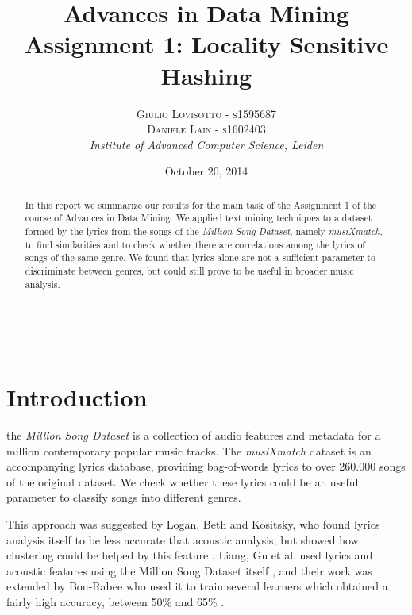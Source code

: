 \documentclass[a4paper, 11pt]{article} %
\title{\textbf{Advances in Data Mining}\\ %
Assignment 1: Locality Sensitive Hashing} %
\author{\textsc{Giulio Lovisotto - s1595687 \\ Daniele Lain - s1602403} %
\\{\textit{Institute of Advanced Computer Science, Leiden}}} %
\date{October 20, 2014} %
\makeatletter
\renewcommand{\maketitle}{ %
\begin{flushright} %
{\LARGE\@title} %

\vspace{50pt} %

{\large\@author} %
\\\@date %

\vspace{40pt} %
\end{flushright}
}
\makeatother
\begin{document}
\maketitle %



\begin{abstract}
In this report we summarize our results for the main task of the  Assignment 1 of the course of Advances in Data Mining.
We applied text mining techniques to a dataset formed by the lyrics from the songs of the \textit{Million Song Dataset}, namely \textit{musiXmatch}, to find similarities and to check whether there are correlations among the lyrics of songs of the same genre. We found that lyrics alone are not a sufficient parameter to discriminate between genres, but could still prove to be useful in broader music analysis.
\end{abstract}

\vspace{20pt} %


\section{Introduction}


the \textit{Million Song Dataset} \cite{MSDS} is a collection of audio features and metadata for a million contemporary popular music tracks. The \textit{musiXmatch} \cite{MXM} dataset is an accompanying lyrics database, providing bag-of-words lyrics to over 260.000 songs of the original dataset.
We check whether these lyrics could be an useful parameter to classify songs into different genres.

 This approach was suggested by Logan, Beth and Kositsky, who found lyrics analysis itself to be less accurate that acoustic analysis, but showed how clustering could be helped by this feature \cite{logan2004semantic}. Liang, Gu et al. used lyrics and acoustic features using the Million Song Dataset itself \cite{liang2011music}, and their work was extended by Bou-Rabee who used it to train several learners which obtained a fairly high accuracy, between 50\% and 65\% \cite{bourabee}.
\end{document}
